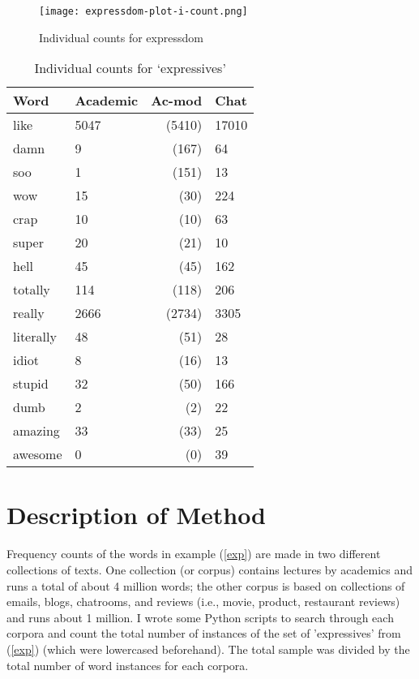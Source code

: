 \documentclass{article}
\begin{document}
\begin{figure}
\texttt{[image: expressdom-plot-i-count.png]}
\caption{Individual counts for expressdom}
\end{figure}       


\begin{table}[!ht]
\caption{Individual counts for `expressives'}\label{icounts}
\begin{center}
\begin{tabular}{|l|l|r|l|}
    \hline
\textbf{Word} & \textbf{Academic} & Ac-mod &\textbf{Chat}\\
\hline \hline
like& 5047& (5410) & 17010 \\ 
damn& 9 & (167) & 64 \\
soo& 1 & (151) & 13 \\
wow& 15 & (30) & 224 \\
crap& 10 & (10) & 63 \\
super& 20 & (21) & 10 \\
hell& 45 & (45) & 162 \\
totally& 114 & (118) & 206 \\
really& 2666 & (2734) & 3305 \\
literally& 48 & (51) & 28 \\
idiot& 8 & (16) & 13 \\
stupid& 32 & (50) & 166 \\
dumb& 2 & (2) & 22 \\
amazing& 33 & (33) & 25 \\
awesome& 0 & (0) & 39\\
   \hline
\end{tabular}
\end{center}
\end{table} 

\section{Description of Method}
Frequency counts of the words in example (\ref{exp}) are made in two different collections of texts. One collection (or corpus) contains lectures by academics and runs a total of about 4 million words; the other corpus is based on collections of emails, blogs, chatrooms, and reviews (i.e., movie, product, restaurant reviews) and runs about 1 million. I wrote some Python scripts to search through each corpora and count the total number of instances of the set of 'expressives' from (\ref{exp}) (which were lowercased beforehand). The total sample was divided by the total number of word instances for each corpora.
\end{document}
